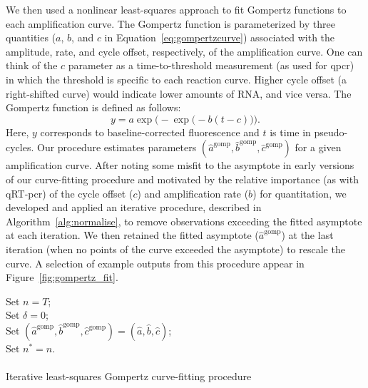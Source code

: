 \documentclass[../thesis.tex]{subfiles}
\begin{document}
We then used a nonlinear least-squares approach to fit Gompertz functions to each amplification curve. The Gompertz function is parameterized by three quantities ($a$, $b$, and $c$ in Equation~\ref{eq:gompertzcurve}) associated with the amplitude, rate, and cycle offset, respectively, of the amplification curve. One can think of the $c$ parameter as a time-to-threshold measurement (as used for \gls{qpcr}) in which the threshold is specific to each reaction curve. Higher cycle offset (a right-shifted curve) would indicate lower amounts of RNA, and vice versa. The Gompertz function is defined as follows:
\begin{equation} \label{eq:gompertzcurve}
    y = a \exp\Big(-\exp\big( -b (t - c)\big)\Big).
\end{equation}
Here, $y$ corresponds to baseline-corrected fluorescence and $t$ is time in pseudo-cycles. Our procedure estimates parameters $(\hat{a}^{\text{gomp}}, \hat{b}^{\text{gomp}}, \hat{c}^{\text{gomp}})$ for a given amplification curve. After noting some misfit to the asymptote in early versions of our curve-fitting procedure and motivated by the relative importance (as with qRT-\gls{pcr}) of the cycle offset ($c$) and amplification rate ($b$) for quantitation, we developed and applied an iterative procedure, described in Algorithm~\ref{alg:normalise}, to remove observations exceeding the fitted asymptote at each iteration. We then retained the fitted asymptote ($\hat{a}^{\text{gomp}}$) at the last iteration (when no points of the curve exceeded the asymptote) to rescale the curve. A selection of example outputs from this procedure appear in Figure~\ref{fig:gompertz_fit}.

\begin{algorithm}[ht]
\SetAlgoLined



Set $n = T$; \\
Set $\delta = 0$; \\
Set $(\hat{a}^{\text{gomp}}, \hat{b}^{\text{gomp}}, \hat{c}^{\text{gomp}}) = (\hat{a}, \hat{b}, \hat{c})$; \\
Set $n^* = n$. \\
~\\
 \caption{Iterative least-squares Gompertz curve-fitting procedure \label{alg:normalise}}
\end{algorithm} 
\end{document}

